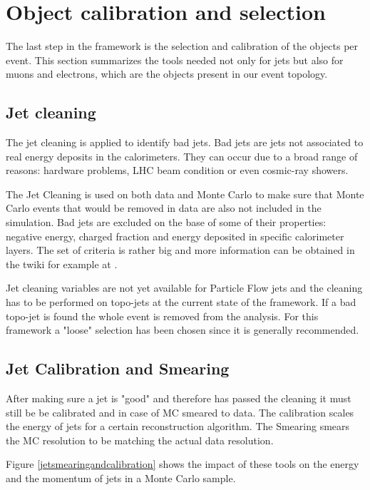 \section{Object calibration and selection}

The last step in the framework is the selection and calibration of the objects per event. This section summarizes the tools needed not only for jets but also for muons and electrons, which are the objects present in our event topology.

\subsection{Jet cleaning}

The jet cleaning is applied to identify bad jets. Bad jets are jets not associated to real energy deposits in the calorimeters. They can occur due to a broad range of reasons: hardware problems, LHC beam condition or even cosmic-ray showers.

The Jet Cleaning is used on both data and Monte Carlo to make sure that Monte Carlo events that would be removed in data are also not included in the simulation.
Bad jets are excluded on the base of some of their properties: negative energy, charged fraction and energy deposited in specific calorimeter layers. The set of criteria is rather big and more information can be obtained in the twiki for example at \cite{jetcleaning}.

Jet cleaning variables are not yet available for Particle Flow jets and the cleaning has to be performed on topo-jets at the current state of the framework. If a bad topo-jet is found the whole event is removed from the analysis.
For this framework a "loose" \cite{jetcleaning} selection has been chosen since it is generally recommended.

\subsection{Jet Calibration and Smearing}

After making sure a jet is "good" and therefore has passed the cleaning it must still be be calibrated and in case of MC smeared to data. The calibration scales the energy of jets for a certain reconstruction algorithm. The Smearing smears the MC resolution to be matching the actual data resolution.

Figure \ref{jetsmearingandcalibration} shows the impact of these tools on the energy and the momentum of jets in a Monte Carlo sample.



